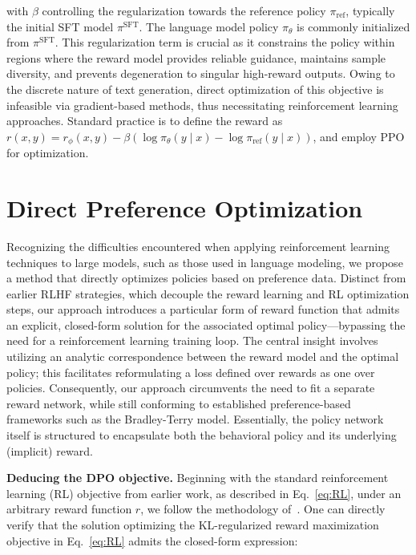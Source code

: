 with $\beta$ controlling the regularization towards the reference policy $\pi_\text{ref}$, typically the initial SFT model $\pi^\text{SFT}$. The language model policy $\pi_\theta$ is commonly initialized from $\pi^\text{SFT}$. This regularization term is crucial as it constrains the policy within regions where the reward model provides reliable guidance, maintains sample diversity, and prevents degeneration to singular high-reward outputs. Owing to the discrete nature of text generation, direct optimization of this objective is infeasible via gradient-based methods, thus necessitating reinforcement learning approaches. Standard practice \citep{ziegler2020finetuning, stiennon2022learning, bai2022training, ouyang2022training} is to define the reward as ${r(x, y) = r_{\phi}(x, y) -\beta (\log \pi_{\theta}(y\mid x) - \log \pi_\text{ref}(y\mid x))}$, and employ PPO \cite{schulman2017proximal} for optimization.

\section{Direct Preference Optimization}\label{sec:DPO}

Recognizing the difficulties encountered when applying reinforcement learning techniques to large models, such as those used in language modeling, we propose a method that directly optimizes policies based on preference data. Distinct from earlier RLHF strategies, which decouple the reward learning and RL optimization steps, our approach introduces a particular form of reward function that admits an explicit, closed-form solution for the associated optimal policy—bypassing the need for a reinforcement learning training loop. The central insight involves utilizing an analytic correspondence between the reward model and the optimal policy; this facilitates reformulating a loss defined over rewards as one over policies. Consequently, our approach circumvents the need to fit a separate reward network, while still conforming to established preference-based frameworks such as the Bradley-Terry model. Essentially, the policy network itself is structured to encapsulate both the behavioral policy and its underlying (implicit) reward.

\textbf{Deducing the DPO objective.} Beginning with the standard reinforcement learning (RL) objective from earlier work, as described in Eq.~\ref{eq:RL}, under an arbitrary reward function $r$, we follow the methodology of~\citet{peters2007reinforcement, peng2019advantage, korbak2022reinforcement, go2023aligning}. One can directly verify that the solution optimizing the KL-regularized reward maximization objective in Eq.~\ref{eq:RL} admits the closed-form expression:

